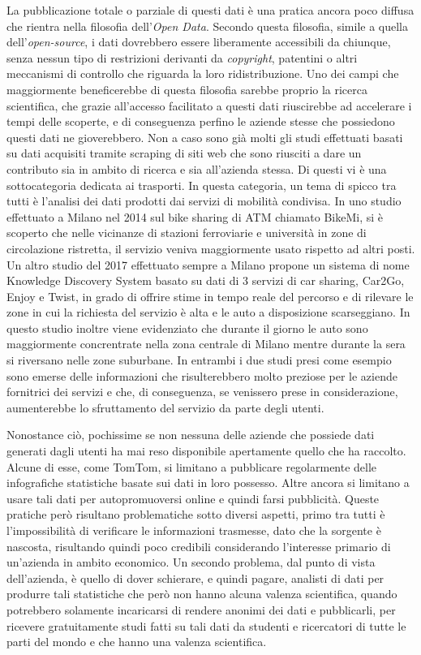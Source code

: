 La pubblicazione totale o parziale di questi dati è una pratica ancora poco diffusa che rientra nella filosofia dell'\emph{Open Data}. Secondo questa filosofia, simile a quella dell'\emph{open-source}, i dati dovrebbero essere liberamente accessibili da chiunque, senza nessun tipo di restrizioni derivanti da \emph{copyright}, patentini o altri meccanismi di controllo che riguarda la loro ridistribuzione. Uno dei campi che maggiormente beneficerebbe di questa filosofia sarebbe proprio la ricerca scientifica, che grazie all'accesso facilitato a questi dati riuscirebbe ad accelerare i tempi delle scoperte, e di conseguenza perfino le aziende stesse che possiedono questi dati ne gioverebbero. Non a caso sono già molti gli studi effettuati basati su dati acquisiti tramite scraping di siti web che sono riusciti a dare un contributo sia in ambito di ricerca e sia all'azienda stessa. Di questi vi è una sottocategoria dedicata ai trasporti. In questa categoria, un tema di spicco tra tutti è l'analisi dei dati prodotti dai servizi di mobilità condivisa. In uno studio effettuato a Milano nel 2014\cite{croci2014} sul bike sharing di ATM chiamato BikeMi, si è scoperto che nelle vicinanze di stazioni ferroviarie e università in zone di circolazione ristretta, il servizio veniva maggiormente usato rispetto ad altri posti. Un altro studio del 2017 effettuato sempre a Milano \cite{pagani} propone un sistema di nome Knowledge Discovery System basato su dati di 3 servizi di car sharing, Car2Go, Enjoy e Twist, in grado di offrire stime in tempo reale del percorso e di rilevare le zone in cui la richiesta del servizio è alta e le auto a disposizione scarseggiano. In questo studio inoltre viene evidenziato che durante il giorno le auto sono maggiormente concrentrate nella zona centrale di Milano mentre durante la sera si riversano nelle zone suburbane. In entrambi i due studi presi come esempio sono emerse delle informazioni che risulterebbero molto preziose per le aziende fornitrici dei servizi e che, di conseguenza, se venissero prese in considerazione, aumenterebbe lo sfruttamento del servizio da parte degli utenti.

 Nonostance ciò, pochissime se non nessuna delle aziende che possiede dati generati dagli utenti ha mai reso disponibile apertamente quello che ha raccolto. Alcune di esse, come TomTom, si limitano a pubblicare regolarmente delle infografiche statistiche basate sui dati in loro possesso. Altre ancora si limitano a usare tali dati per autopromuoversi online e quindi farsi pubblicità. Queste pratiche però risultano problematiche sotto diversi aspetti, primo tra tutti è l'impossibilità di verificare le informazioni trasmesse, dato che la sorgente è nascosta, risultando quindi poco credibili considerando l'interesse primario di un'azienda in ambito economico. Un secondo problema, dal punto di vista dell'azienda, è quello di dover schierare, e quindi pagare, analisti di dati per produrre tali statistiche che però non hanno alcuna valenza scientifica, quando potrebbero solamente incaricarsi di rendere anonimi dei dati e pubblicarli, per ricevere gratuitamente studi fatti su tali dati da studenti e ricercatori di tutte le parti del mondo e che hanno una valenza scientifica.





